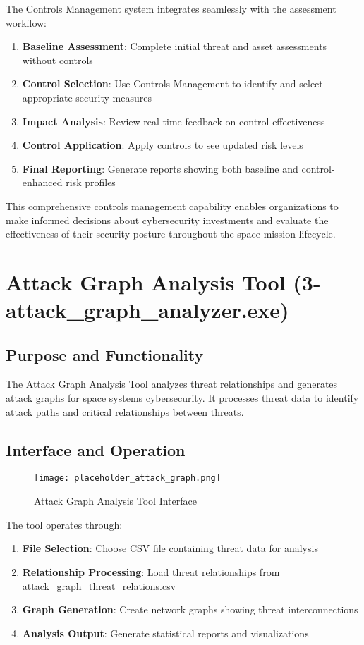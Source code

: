 \documentclass[binding=0.6cm]{sapthesis}
\begin{document}
The Controls Management system integrates seamlessly with the assessment workflow:

\begin{enumerate}
    \item \textbf{Baseline Assessment}: Complete initial threat and asset assessments without controls
    \item \textbf{Control Selection}: Use Controls Management to identify and select appropriate security measures
    \item \textbf{Impact Analysis}: Review real-time feedback on control effectiveness
    \item \textbf{Control Application}: Apply controls to see updated risk levels
    \item \textbf{Final Reporting}: Generate reports showing both baseline and control-enhanced risk profiles
\end{enumerate}

This comprehensive controls management capability enables organizations to make informed decisions about cybersecurity investments and evaluate the effectiveness of their security posture throughout the space mission lifecycle.

\section{Attack Graph Analysis Tool (3-attack\_graph\_analyzer.exe)}

\subsection{Purpose and Functionality}

The Attack Graph Analysis Tool analyzes threat relationships and generates attack graphs for space systems cybersecurity. It processes threat data to identify attack paths and critical relationships between threats.

\subsection{Interface and Operation}

\begin{figure}[H]
    \centering
    \texttt{[image: placeholder\_attack\_graph.png]}
    \caption{Attack Graph Analysis Tool Interface}
    \label{fig:attack_graph}
\end{figure}

The tool operates through:
\begin{enumerate}
    \item \textbf{File Selection}: Choose CSV file containing threat data for analysis
    \item \textbf{Relationship Processing}: Load threat relationships from attack\_graph\_threat\_relations.csv
    \item \textbf{Graph Generation}: Create network graphs showing threat interconnections
    \item \textbf{Analysis Output}: Generate statistical reports and visualizations
\end{enumerate}
\end{document}
